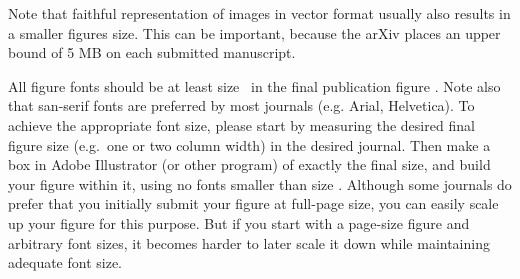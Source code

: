  Note that faithful representation of images in vector format usually also results in a smaller figures size. This can be important, because the arXiv places an upper bound of 5 MB on each submitted manuscript.

 All figure fonts should be at least size \minfont\ in the final publication figure \cite{deBivort}. Note also that san-serif fonts are preferred by most journals (e.g. Arial, Helvetica). To achieve the appropriate font size, please start by measuring the desired final figure size (e.g.\ one or two column width) in the desired journal. Then make a box in Adobe Illustrator (or other program) of exactly the final size, and build your figure within it, using no fonts smaller than size \minfont. Although some journals do prefer that you initially submit your figure at full-page size, you can easily scale up your figure for this purpose. But if you start with a page-size figure and arbitrary font sizes, it becomes harder to later scale it down while maintaining adequate font size.

